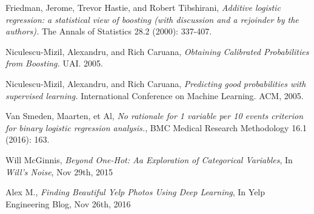\documentclass{article}
\begin{document}
\begin{thebibliography}{9} 

\bibitem[1] Friedman, Jerome, Trevor Hastie, and Robert Tibshirani, \emph{Additive logistic regression: a statistical view of boosting (with discussion and a rejoinder by the authors).} The Annals of Statistics 28.2 (2000): 337-407.

\bibitem[2] Niculescu-Mizil, Alexandru, and Rich Caruana, \emph{Obtaining Calibrated Probabilities from Boosting.} UAI. 2005.

\bibitem[3] Niculescu-Mizil, Alexandru, and Rich Caruana, \emph{Predicting good probabilities with supervised learning.} International Conference on Machine Learning. ACM, 2005.

\bibitem[4] Van Smeden, Maarten, et Al, \emph{No rationale for 1 variable per 10 events criterion for binary logistic regression analysis.}, BMC Medical Research Methodology 16.1 (2016): 163.

\bibitem[5] Will McGinnis, \emph{Beyond One-Hot: Aa Exploration of Categorical Variables}, In {\em Will's Noise}, Nov 29th, 2015

 Alex M., \emph{Finding Beautiful Yelp Photos Using Deep Learning}, In Yelp Engineering Blog, Nov 26th, 2016

\end{thebibliography}
\end{document}
